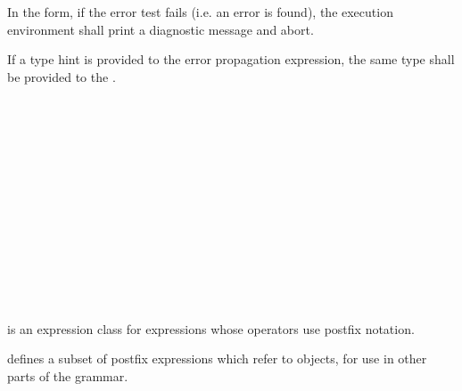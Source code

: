 \specsubsubitem
In the \terminal{!} form, if the error test fails (i.e. an error is found), the
execution environment shall print a diagnostic message and abort.

\specsubsubitem
If a type hint is provided to the error propagation expression, the same type
shall be provided to the .


\begin{grammar}
 \\
	 \\
	 \\
	 \\
	 \\
	 \\
	 \\

 \\
	 \\
	 \\
	 \\
	\terminal{(}  \terminal{)} \\
\end{grammar}

\specsubsubitem
{} is an expression class for expressions whose
operators use postfix notation.

\specsubsubitem
{} defines a subset of postfix expressions which
refer to objects, for use in other parts of the grammar.


\begin{grammar}
 \\
	 \terminal{(} \terminal{)} \\
	 \terminal{(}  \terminal{)} \\
	 \terminal{(}  \terminal{)} \\
\end{grammar}

